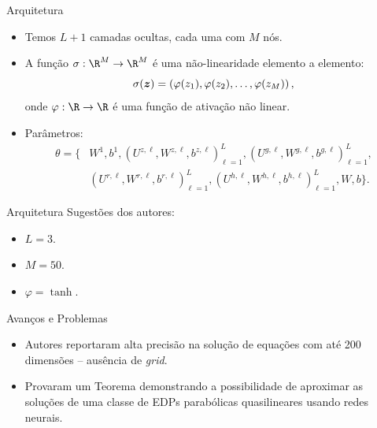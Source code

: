\documentclass[13pt]{beamer}
\begin{document}
\begin{frame}{Arquitetura}
    \begin{itemize}
        \item<1-> Temos \( L + 1 \) camadas ocultas, cada uma com \( M \) nós.
        \item<2-> A função \( \sigma : \R^{ M } \to \R^{ M } \) é uma não-linearidade elemento a elemento:
            \begin{equation*}
                \sigma ( \bm{z} ) = \left(
                    \varphi ( z_{ 1 } ), \varphi ( z_{ 2 } ), \dots, \varphi ( z_{ M } )
                \right)
            ,\end{equation*}
            onde \( \varphi : \R \to \R \) é uma função de ativação não linear.
        \item<3-> Parâmetros:
        \begin{align*}
            \theta = \Big\{ &W^{ 1 }, b^{ 1 },
                \left(
                    U^{ z, \ell }, W^{ z, \ell }, b^{ z, \ell }
                \right)_{ \ell = 1 }^{ L },
                \left(
                    U^{ g, \ell }, W^{ g, \ell }, b^{ g, \ell }
                \right)_{ \ell = 1 }^{ L }, \\
                            &\left(
                                U^{ r, \ell }, W^{ r, \ell }, b^{ r, \ell }
                            \right)_{ \ell = 1 }^{ L },
                            \left(
                                U^{ h, \ell }, W^{ h, \ell }, b^{ h, \ell }
                        \right)_{ \ell = 1 }^{ L }, W, b \Big\}
        .\end{align*}
    \end{itemize}
\end{frame}

\begin{frame}{Arquitetura}
    Sugestões dos autores:
    \begin{itemize}
        \item \( L = 3 \).
        \item \( M = 50 \).
        \item \( \varphi = \tanh \).
    \end{itemize}
\end{frame}

\begin{frame}{Avanços e Problemas}
    \begin{itemize}
        \item<1-> Autores reportaram alta precisão na solução de equações com até 200 dimensões -- ausência de \emph{grid}.
        \item<2-> Provaram um Teorema demonstrando a possibilidade de aproximar as soluções de uma classe de EDPs parabólicas quasilineares usando redes neurais.

    \end{itemize}
\end{frame}
\end{document}
